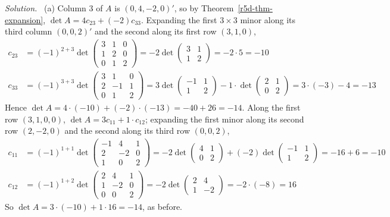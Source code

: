 \documentclass[12pt]{article}
\theoremstyle{definition}
\newenvironment{solution}{\par\noindent\textit{Solution.}\ }{\par\smallskip}
\begin{document}
\begin{solution}
(a) Column \(3\) of \(A\) is \((0,4,-2,0)'\), so by Theorem~\ref{r5d-thm-expansion}, \(\det A=4c_{23}+(-2)c_{33}\).
Expanding the first \(3\times3\) minor along its third column \((0,0,2)'\) and the second along its first row
\((3,1,0)\),
\[
\begin{aligned}
c_{23}&=(-1)^{2+3}\det\begin{pmatrix}3&1&0\\1&2&0\\0&1&2\end{pmatrix}=-2\det\begin{pmatrix}3&1\\1&2\end{pmatrix}=-2\cdot5=-10\\
c_{33}&=(-1)^{3+3}\det\begin{pmatrix}3&1&0\\2&-1&1\\0&1&2\end{pmatrix}
=3\det\begin{pmatrix}-1&1\\1&2\end{pmatrix}-1\cdot\det\begin{pmatrix}2&1\\0&2\end{pmatrix}=3\cdot(-3)-4=-13
\end{aligned}
\]
Hence \(\det A=4\cdot(-10)+(-2)\cdot(-13)=-40+26=-14\). Along the first row \((3,1,0,0)\), \(\det A=3c_{11}+1\cdot c_{12}\);
expanding the first minor along its second row \((2,-2,0)\) and the second along its third row \((0,0,2)\),
\[
\begin{aligned}
c_{11}&=(-1)^{1+1}\det\begin{pmatrix}-1&4&1\\2&-2&0\\1&0&2\end{pmatrix}
=-2\det\begin{pmatrix}4&1\\0&2\end{pmatrix}+(-2)\det\begin{pmatrix}-1&1\\1&2\end{pmatrix}=-16+6=-10\\
c_{12}&=(-1)^{1+2}\det\begin{pmatrix}2&4&1\\1&-2&0\\0&0&2\end{pmatrix}=-2\det\begin{pmatrix}2&4\\1&-2\end{pmatrix}=-2\cdot(-8)=16
\end{aligned}
\]
So \(\det A=3\cdot(-10)+1\cdot16=-14\), as before.


\end{solution}
\end{document}
